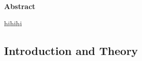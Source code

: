 \documentclass{article}
\begin{document}
\begin{center}
    \textbf{Abstract}
\end{center}
hihihi
\begin{multicols}{2}



\section{Introduction and Theory}

\end{multicols}
\end{document}
